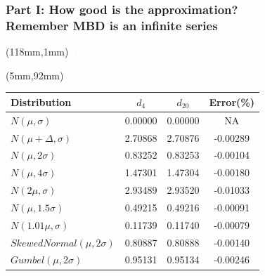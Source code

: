 \documentclass[x11names, svgnames]{beamer}
\begin{document}
\begin{frame}
\frametitle{Part I: How good is the approximation?\\ \small{Remember MBD is an infinite series}}
\begin{textblock*}{50mm}(118mm,1mm)
\scriptsize
\textcolor{white}{\textbf{IEEE}}
\end{textblock*}
\begin{textblock*}{100mm}(5mm,92mm)
\scriptsize
\textcolor{white}{SOURCE: arXiv: 2008.09612}
\end{textblock*}
\vspace{0.1in}

\begin{table}[htbp]
\begin{tabular}{|l|c|c|c|}
\hline
Distribution & $d_4$ & $d_{20}$ & Error(\%)\\
\hline
$N(\mu, \sigma)$ & 0.00000 & 0.00000 & NA\\
\hline
$N(\mu+\Delta, \sigma)$ & 2.70868 & 2.70876 & -0.00289\\
\hline
$N(\mu, 2\sigma)$ & 0.83252 & 0.83253 & -0.00104\\
\hline
$N(\mu, 4\sigma)$ & 1.47301 & 1.47304 & -0.00180\\
\hline
$N(2\mu, \sigma)$ & 2.93489 & 2.93520 & -0.01033\\
\hline
$N(\mu, 1.5\sigma)$ & 0.49215 & 0.49216 & -0.00091\\
\hline
$N(1.01\mu, \sigma)$ & 0.11739 & 0.11740 & -0.00079\\
\hline
$Skewed Normal(\mu, 2\sigma)$ & 0.80887 & 0.80888 & -0.00140\\
\hline
$Gumbel(\mu, 2\sigma)$ & 0.95131 & 0.95134 & -0.00246\\
\hline
\end{tabular}
\end{table}
\end{frame}
\end{document}
